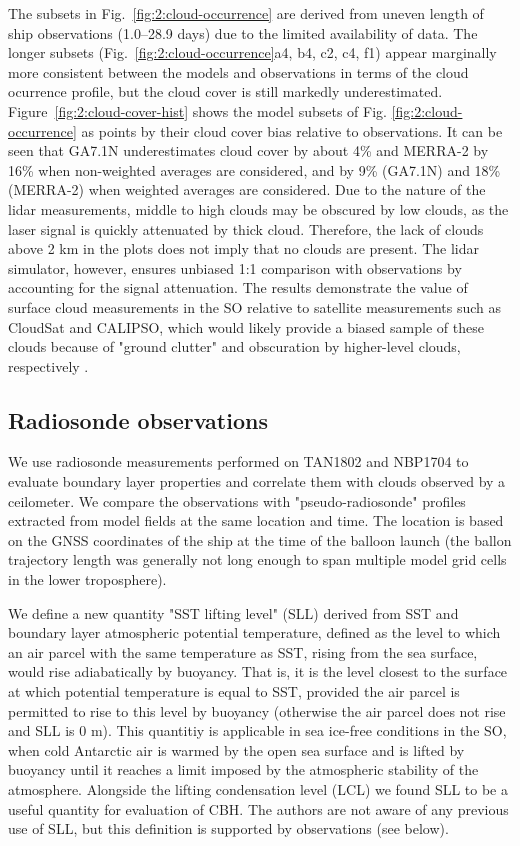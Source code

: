 The subsets in Fig.~\ref{fig:2:cloud-occurrence} are derived from uneven
length of ship observations (1.0--28.9 days) due to the limited availability of data.
The longer subsets (Fig.~\ref{fig:2:cloud-occurrence}a4, b4, c2, c4, f1)
appear marginally more consistent between the models and observations
in terms of the cloud ocurrence profile, but the cloud cover is still markedly
underestimated.
Figure~\ref{fig:2:cloud-cover-hist} shows the model subsets of Fig.
\ref{fig:2:cloud-occurrence} as points by their cloud cover bias relative to
observations. It can be seen that GA7.1N underestimates cloud cover by about
4\% and MERRA-2 by 16\% when non-weighted averages are considered, and by 9\%
(GA7.1N) and 18\% (MERRA-2) when weighted averages are considered.
Due to the nature of the lidar measurements, middle to high clouds may be
obscured by low clouds, as the laser signal is quickly attenuated by thick
cloud. Therefore, the lack of clouds above 2 \unit{km} in the plots does not
imply that no clouds are present. The lidar simulator, however, ensures
unbiased 1:1 comparison with observations by accounting for the signal
attenuation.
The results demonstrate the value of surface cloud measurements in the SO
relative to satellite measurements such as CloudSat and CALIPSO, which would
likely provide a biased sample of these clouds because of "ground clutter"
and obscuration by higher-level clouds, respectively \citep{alexander2018}.

\subsection{Radiosonde observations}
\label{sec:2:radiosonde-observations}

We use radiosonde measurements performed on TAN1802 and NBP1704 to
evaluate boundary layer properties and correlate them with clouds observed by
a ceilometer. We compare the observations with "pseudo-radiosonde" profiles
extracted from model fields at the same location and time. The location is
based on the GNSS coordinates of the ship at the time of the balloon launch
(the ballon trajectory length was generally not long enough to span multiple
model grid cells in the lower troposphere).

We define a new quantity "SST lifting level" (SLL) derived
from SST and boundary layer atmospheric potential temperature,
defined as the level to which
an air parcel with the same temperature as SST, rising from the sea surface,
would rise adiabatically by buoyancy. That is, it is the level closest to the
surface at which potential temperature is equal to SST, provided the air parcel
is permitted to rise to this level by buoyancy (otherwise the air parcel does
not rise and SLL is 0 m). This quantitiy is applicable in sea ice-free
conditions in the SO, when cold Antarctic air is warmed by the open sea surface
and is lifted by buoyancy until it reaches a limit imposed by the atmospheric
stability of the atmosphere. Alongside the lifting condensation level (LCL) we
found SLL to be a useful quantity for evaluation of CBH. The
authors are not aware of any previous use of SLL, but this definition is
supported by observations (see below).

